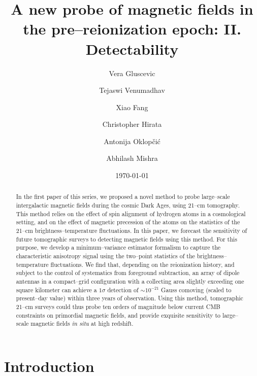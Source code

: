 \documentclass[aps,prd,twocolumn,floatfix,showpacs,superscriptaddress,nofootinbib]{revtex4-1}
\begin{document}
\widetext    
\title{A new probe of magnetic fields in the pre--reionization epoch: II. Detectability}
\author{Vera Gluscevic}
\author{Tejaswi Venumadhav}
\author{Xiao Fang}
\author{Christopher Hirata}
\author{Antonija Oklop\v ci\' c}
\author{Abhilash Mishra} 
\date{\today}  
    
 
\begin{abstract} 
In the first paper of this series, we proposed a novel method to probe large--scale intergalactic magnetic fields during the cosmic Dark Ages, using 21--cm tomography. This method relies on the effect of spin alignment of hydrogen atoms in a cosmological setting, and on the effect of magnetic precession of the atoms on the statistics of the 21--cm brightness--temperature fluctuations. In this paper, we forecast the sensitivity of future tomographic surveys to detecting magnetic fields using this method. For this purpose, we develop a minimum--variance estimator formalism to capture the characteristic anisotropy signal using the two--point statistics of the brightness--temperature fluctuations. We find that, depending on the reionization history, and subject to the control of systematics from foreground subtraction, an array of dipole antennas in a compact--grid configuration with a collecting area slightly exceeding one square kilometer can achieve a $1\sigma$ detection of $\sim$$10^{-21}$ Gauss comoving (scaled to present--day value) within three years of observation. Using this method, tomographic 21--cm surveys could thus probe ten orders of magnitude below current CMB constraints on primordial magnetic fields, and provide exquisite sensitivity to large--scale magnetic fields \textit{in situ} at high redshift. 
\end{abstract} 
        
\pacs{} 
\maketitle     
\section{Introduction}
\label{sec:intro}
\end{document}
